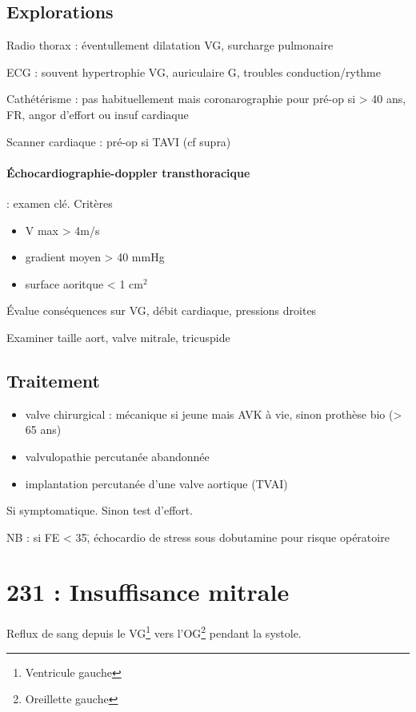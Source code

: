 \subsection{Explorations}
Radio thorax : éventullement dilatation VG, surcharge pulmonaire

ECG : souvent hypertrophie VG, auriculaire G, troubles conduction/rythme

Cathétérisme : pas habituellement mais coronarographie pour pré-op si \male > 40 ans, FR, angor d'effort ou insuf
cardiaque

Scanner cardiaque : pré-op si TAVI (cf supra)

\paragraph{Échocardiographie-doppler transthoracique} : examen clé. Critères
\begin{itemize}
  \item V max > 4m/s
  \item gradient moyen > 40 mmHg
  \item surface aoritque < 1 $\text{cm}^2$
\end{itemize}
Évalue conséquences sur VG, débit cardiaque, pressions droites

Examiner taille aort, valve mitrale, tricuspide

\subsection{Traitement}
\begin{itemize}
  \item valve chirurgical : mécanique si jeune mais AVK à vie, sinon prothèse bio (> 65
    ans)
  \item valvulopathie percutanée abandonnée
  \item implantation percutanée d'une valve aortique (TVAI)
\end{itemize}
Si symptomatique. Sinon test d'effort.

NB : si FE < 35\=, échocardio de stress sous dobutamine pour risque opératoire


\section{231 : Insuffisance mitrale}%
\label{sec:231_insuffisance_mitrale}
Reflux de sang depuis le VG\footnote{Ventricule gauche} vers l'OG\footnote{Oreillette gauche} pendant la systole.

